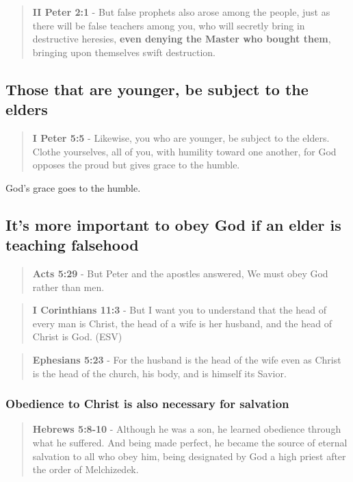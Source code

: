 \documentclass[11pt]{article}
\begin{document}
\begin{quote}
\textbf{II Peter 2:1} - But false prophets also arose among the people, just as there will be false teachers among you, who will secretly bring in destructive heresies, \textbf{even denying the Master who bought them}, bringing upon themselves swift destruction.
\end{quote}

\subsection{Those that are younger, be subject to the elders}
\label{sec:org5afefce}
\begin{quote}
\textbf{I Peter 5:5} - Likewise, you who are younger, be subject to the elders. Clothe yourselves, all of you, with humility toward one another, for God opposes the proud but gives grace to the humble.
\end{quote}

God's grace goes to the humble.

\subsection{It's more important to obey God if an elder is teaching falsehood}
\label{sec:org7d965fc}
\begin{quote}
\textbf{Acts 5:29} - But Peter and the apostles answered, We must obey God rather than men.
\end{quote}

\begin{quote}
\textbf{I Corinthians 11:3} - But I want you to understand that the head of every man is Christ, the head of a wife is her husband, and the head of Christ is God. (ESV)
\end{quote}

\begin{quote}
\textbf{Ephesians 5:23} - For the husband is the head of the wife even as Christ is the head of the church, his body, and is himself its Savior.
\end{quote}

\subsubsection{Obedience to Christ is also necessary for salvation}
\label{sec:org7d5db54}
\begin{quote}
\textbf{Hebrews 5:8-10} - Although he was a son, he learned obedience through what he suffered. And being made perfect, he became the source of eternal salvation to all who obey him, being designated by God a high priest after the order of Melchizedek.
\end{quote}
\end{document}
